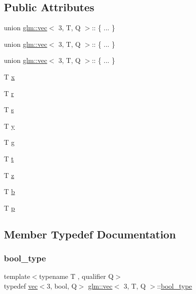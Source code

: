 \subsection*{Public Attributes}
\begin{DoxyCompactItemize}
\item 
union \hyperlink{structglm_1_1vec}{glm\+::vec}$<$ 3, T, Q $>$\+:: \{ ... \}  
\item 
union \hyperlink{structglm_1_1vec}{glm\+::vec}$<$ 3, T, Q $>$\+:: \{ ... \}  
\item 
union \hyperlink{structglm_1_1vec}{glm\+::vec}$<$ 3, T, Q $>$\+:: \{ ... \}  
\item 
T \hyperlink{structglm_1_1vec_3_013_00_01_t_00_01_q_01_4_aa124b422bca85bd1e079c5880591d056}{x}
\item 
T \hyperlink{structglm_1_1vec_3_013_00_01_t_00_01_q_01_4_a7c3057b389465e2d02536d22ae2c1110}{r}
\item 
T \hyperlink{structglm_1_1vec_3_013_00_01_t_00_01_q_01_4_ab09b6a68cfa21e42185cd4aff2a7c55e}{s}
\item 
T \hyperlink{structglm_1_1vec_3_013_00_01_t_00_01_q_01_4_a3ff0c9672e374f78b7403d0c04ddc329}{y}
\item 
T \hyperlink{structglm_1_1vec_3_013_00_01_t_00_01_q_01_4_aa01fb9a90b9b739797a0f1ca96206570}{g}
\item 
T \hyperlink{structglm_1_1vec_3_013_00_01_t_00_01_q_01_4_ab7239400a0533eada559b15c3361dc3c}{t}
\item 
T \hyperlink{structglm_1_1vec_3_013_00_01_t_00_01_q_01_4_a33809116048db7caf55162a670dec598}{z}
\item 
T \hyperlink{structglm_1_1vec_3_013_00_01_t_00_01_q_01_4_a3bec3aae8fdbe58bc4a6354285609050}{b}
\item 
T \hyperlink{structglm_1_1vec_3_013_00_01_t_00_01_q_01_4_acc882ded9421aad1b65564cde0ca1411}{p}
\end{DoxyCompactItemize}


\subsection{Member Typedef Documentation}
\mbox{\label{structglm_1_1vec_3_013_00_01_t_00_01_q_01_4_a8574623d0fe3b330e18c10b8d5022ca6}} 
\subsubsection{\texorpdfstring{bool\+\_\+type}{bool\_type}}
{\footnotesize\ttfamily template$<$typename T , qualifier Q$>$ \\
typedef \hyperlink{structglm_1_1vec}{vec}$<$3, bool, Q$>$ \hyperlink{structglm_1_1vec}{glm\+::vec}$<$ 3, T, Q $>$\+::\hyperlink{structglm_1_1vec_3_013_00_01_t_00_01_q_01_4_a8574623d0fe3b330e18c10b8d5022ca6}{bool\+\_\+type}}

